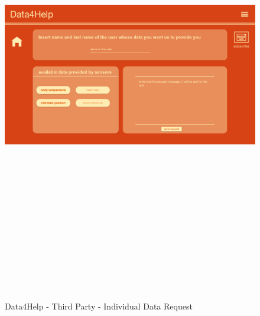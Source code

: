 \begin{figure}[H]
    \includegraphics[width=.6\linewidth, height = 20cm, keepaspectratio]{./Images/Mockups/Data4Help/D4HTP/D4HTP_IndividualDataRequest.png}
    \centering
    \caption{Data4Help - Third Party - Individual Data Request}
    \label{fig:sab}
 \end{figure}


